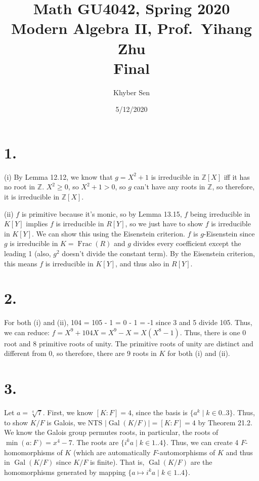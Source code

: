 \documentclass[fleqn]{article}
\title{
Math GU4042, Spring 2020 \\
Modern Algebra II, Prof.\ Yihang Zhu \\
Final
}
\author{Khyber Sen}
\date{5/12/2020}
\DeclareMathOperator{\Frac}{Frac}
\DeclareMathOperator{\Gal}{Gal}
\begin{document}
    \section{1.}
    (i)
    By Lemma 12.12, we know that $g = X^2 + 1$ is irreducible in $\mathbb{Z}[X]$ iff it has no root in $\mathbb{Z}$.  $X^2 \geq 0$, so $X^2 + 1 > 0$, so $g$ can't have any roots in $\mathbb{Z}$, so therefore, it is irreducible in $\mathbb{Z}[X]$.
    
    $ $ \\
    (ii)
    $f$ is primitive because it's monic, so by Lemma 13.15, $f$ being irreducible in $K[Y]$ implies $f$ is irreducible in $R[Y]$, so we just have to show $f$ is irreducible in $K[Y]$.  We can show this using the Eisenstein criterion.  $f$ is $g$-Eisenstein since $g$ is irreducible in $K = \Frac(R)$ and $g$ divides every coefficient except the leading 1 (also, $g^2$ doesn't divide the constant term).  By the Eisenstein criterion, this means $f$ is irreducible in $K[Y]$, and thus also in $R[Y]$.
    
    \pagebreak
    
    \section{2.}
    For both (i) and (ii), 104 = 105 - 1 = 0 - 1 = -1 since 3 and 5 divide 105.  Thus, we can reduce: $f = X^9 + 104X = X^9 - X = X(X^8 - 1)$.  Thus, there is one 0 root and 8 primitive roots of unity.  The primitive roots of unity are distinct and different from 0, so therefore, there are 9 roots in $K$ for both (i) and (ii).
    
    \pagebreak
    
    \section{3.}
    Let $a = \sqrt[4]{7}$.  First, we know $[K : F] = 4$, since the basis is $\{a^k \mid k \in 0..3\}$.  Thus, to show $K/F$ is Galois, we NTS $|\Gal(K/F)| = [K : F] = 4$ by Theorem 21.2.  We know the Galois group permutes roots, in particular, the roots of $\min(a : F) = x^4 - 7$.  The roots are $\{i^k a \mid k \in 1..4\}$.  Thus, we can create 4 $F$-homomorphisms of $K$ (which are automatically $F$-automorphisms of $K$ and thus in $\Gal(K/F)$ since $K/F$ is finite).  That is, $\Gal(K/F)$ are the homomorphisms generated by mapping $\{a \mapsto i^k a \mid k \in 1..4\}$.
    
    \pagebreak
    
\end{document}

